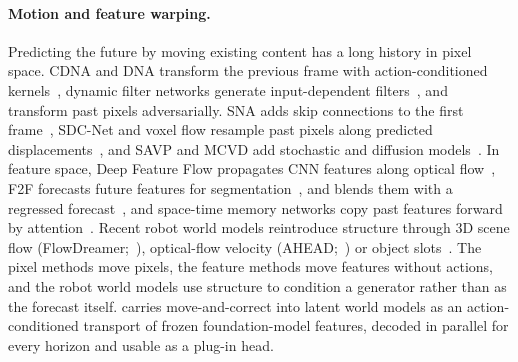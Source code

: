 \paragraph{Motion and feature warping.}
Predicting the future by moving existing content has a long history in pixel space.
%
CDNA and DNA transform the previous frame with action-conditioned kernels~\citep{finn2016advection}, dynamic filter
networks generate input-dependent filters~\citep{debrabandere2016dfn}, and \citet{vondrick2017transformers} transform
past pixels adversarially.
%
SNA adds skip connections to the first frame~\citep{ebert2017skip}, SDC-Net and voxel flow resample past pixels along
predicted displacements~\citep{reda2018sdcnet,liu2017voxelflow}, and SAVP and MCVD add stochastic and diffusion
models~\citep{lee2018savp,voleti2022mcvd}.
%
In feature space, Deep Feature Flow propagates CNN features along optical flow~\citep{zhu2017dff}, F2F forecasts future
features for segmentation~\citep{luc2017deeper,luc2018f2f}, 
and blends them with a regressed forecast~\citep{saric2020warp}, and space-time memory networks copy past features
forward by attention~\citep{oh2019stm}.
%
Recent robot world models reintroduce structure through 3D scene flow (FlowDreamer;~\citealp{guo2026flowdreamer}),
optical-flow velocity (AHEAD;~\citealp{syed2026ahead}) or object slots~\citep{wu2023slotformer,mosbach2025sold}.
%
The pixel methods move pixels, the feature methods move features without actions, and the robot world models use
structure to condition a generator rather than as the forecast itself.
%
\ours{} carries move-and-correct into latent world models as an action-conditioned transport of frozen foundation-model
features, decoded in parallel for every horizon and usable as a plug-in head.
